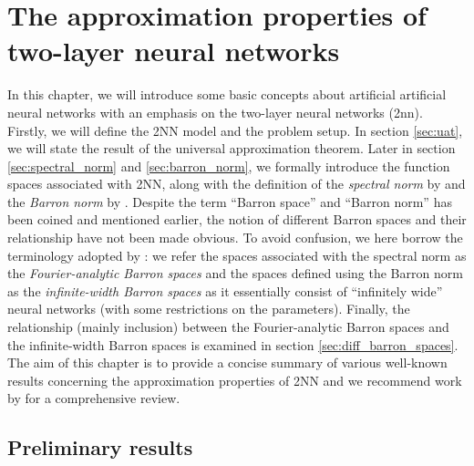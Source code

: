\chapter{The approximation properties of two-layer neural networks}

\TODO

In this chapter, we will introduce some basic concepts about artificial
artificial neural networks with an emphasis on the two-layer neural networks
(\gls{2nn}). Firstly, we will define the 2NN model and the problem setup. In
section \ref{sec:uat}, we will state the result of the universal approximation
theorem. Later in section \ref{sec:spectral_norm} and \ref{sec:barron_norm}, we
formally introduce the function spaces associated with 2NN, along with the
definition of the \textit{spectral norm} by
\cite{barronUniversalApproximationBounds1993} and the \textit{Barron norm} by
\cite{eBarronSpaceFlowinduced2021}. Despite the term ``Barron space'' and
``Barron norm'' has been coined and mentioned earlier, the notion of different
Barron spaces and their relationship have not been made obvious. To avoid
confusion, we here borrow the terminology adopted by
\cite{carageaNeuralNetworkApproximation2022}: we refer the spaces associated
with the spectral norm as the \textit{Fourier-analytic Barron spaces} and the
spaces defined using the Barron norm as the \textit{infinite-width Barron
spaces} as it essentially consist of ``infinitely wide'' neural networks (with
some restrictions on the parameters). Finally, the relationship (mainly
inclusion) between the Fourier-analytic Barron spaces and the infinite-width
Barron spaces is examined in section \ref{sec:diff_barron_spaces}. The aim of
this chapter is to provide a concise summary of various well-known results
concerning the approximation properties of 2NN and we recommend work by
\cite{eMathematicalUnderstandingNeural2020,bernerModernMathematicsDeep2021} for
a comprehensive review.






\section{Preliminary results}


